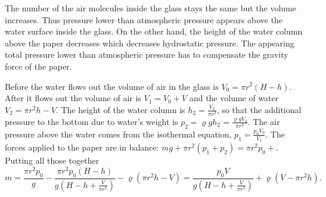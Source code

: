{\ifEngHint
The number of the air molecules inside the glass stays the same but the volume increases. Thus pressure lower than atmospheric pressure appears above the water surface inside the glass. On the other hand, the height of the water column above the paper decreases which decreases hydrostatic pressure. The appearing total pressure lower than atmospheric pressure has to compensate the gravity force of the paper.
\fi


\ifEngSolution
Before the water flows out the volume of air in the glass is $V_0 = \pi r^2 (H-h)$. After it flows out the volume of air is $V_1 = V_0 + V$ and the volume of water $V_2 = \pi r^2 h - V$. The height of the water column is $h_2 = \frac{ V_2 }{ \pi r^2 }$, so that the additional pressure to the bottom due to water’s weight is $p_2 = \varrho g h_2 = \frac{ \varrho g V_2 }{ \pi r^2 }$. The air pressure above the water comes from the isothermal equation, $p_1 = \frac{p_0 V_0}{V_1}$. The forces applied to the paper are in balance: $mg + \pi r^2 (p_1 + p_2) = \pi r^2 p_0+$. Putting all those together
\[ m =
\frac{ \pi r^2 p_0 }{ g } -
\frac{ \pi r^2 p_0 (H-h) }{ g \left( H - h + \frac{V}{\pi r^2} \right) } -
\varrho \left( \pi r^2 h - V \right)
=
\frac{ p_0 V }{ g \left( H - h + \frac{V}{ \pi r^2 } \right) } + \varrho \left( V - \pi r^2 h \right).
\]
\fi
}